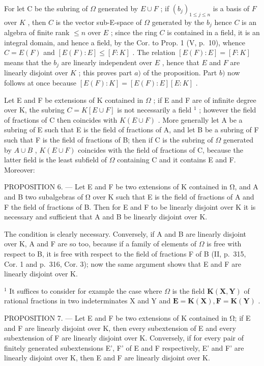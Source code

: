 For let C be the subring of \(\Omega\) generated by \(E \cup F\) ; if \((b_j)_{1 \leq j \leq n}\) is a basis of \(F\) over \(K\) , then \(C\) is the vector sub-E-space of \(\Omega\) generated by the \(b_j\) hence \(C\) is an algebra of finite rank \(\leq n\) over \(E\) ; since the ring \(C\) is contained in a field, it is an integral domain, and hence a field, by the Cor. to Prop. 1 (V, p.~10), whence \(C = E(F)\) and \([E(F):E] \leq [F:K]\) . The relation \([E(F):E] = [F:K]\) means that the \(b_j\) are linearly independent over \(E\) , hence that \(E\) and \(F\) are linearly disjoint over \(K\) ; this proves part \(a)\) of the proposition. Part \(b)\) now follows at once because \([E(F):K] = [E(F):E][E:K]\) .

Let E and F be extensions of K contained in \(\Omega\) ; if E and F are of infinite degree over K, the subring \(C = K[E \cup F]\) is not necessarily a field \(^{1}\) ; however the field of fractions of C then coincides with \(K(E \cup F)\) . More generally let A be a subring of E such that E is the field of fractions of A, and let B be a subring of F such that F is the field of fractions of B; then if C is the subring of \(\Omega\) generated by \(A \cup B\) , \(K(E \cup F)\) coincides with the field of fractions of C, because the latter field is the least subfield of \(\Omega\) containing C and it contains E and F. Moreover:

PROPOSITION 6. --- Let E and F be two extensions of K contained in Ω, and A and B two subalgebras of Ω over K such that E is the field of fractions of A and F the field of fractions of B. Then for E and F to be linearly disjoint over K it is necessary and sufficient that A and B be linearly disjoint over K.

The condition is clearly necessary. Conversely, if A and B are linearly disjoint over K, A and F are so too, because if a family of elements of \(\Omega\) is free with respect to B, it is free with respect to the field of fractions F of B (II, p.~315, Cor. 1 and p.~316, Cor. 3); now the same argument shows that E and F are linearly disjoint over K.

\(^{1}\) It suffices to consider for example the case where \(\Omega\) is the field \(\mathbf{K}(\mathbf{X},\mathbf{Y})\) of rational fractions in two indeterminates X and Y and \(\mathbf{E}=\mathbf{K}(\mathbf{X}),\mathbf{F}=\mathbf{K}(\mathbf{Y})\) .

PROPOSITION 7. --- Let E and F be two extensions of K contained in Ω; if E and F are linearly disjoint over K, then every subextension of E and every subextension of F are linearly disjoint over K. Conversely, if for every pair of finitely generated subextensions E', F' of E and F respectively, E' and F' are linearly disjoint over K, then E and F are linearly disjoint over K.

